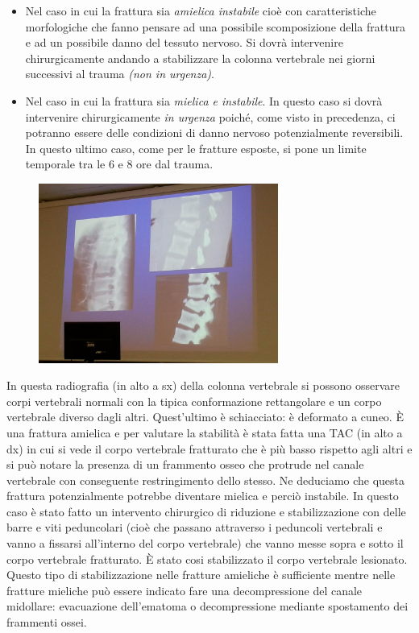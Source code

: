 \begin{itemize}
\begin{itemize}
\item
  Nel caso in cui la frattura sia \emph{amielica instabile} cioè con caratteristiche morfologiche che fanno pensare ad una possibile scomposizione della frattura e ad un possibile danno del tessuto nervoso. Si dovrà intervenire chirurgicamente andando a stabilizzare la colonna vertebrale nei giorni successivi al trauma \emph{(non in urgenza)}.
\item
  Nel caso in cui la frattura sia \emph{mielica e instabile}. In questo caso si dovrà intervenire chirurgicamente \emph{in urgenza} poiché, come visto in precedenza, ci potranno essere delle condizioni di danno nervoso potenzialmente reversibili. In questo ultimo caso, come per le fratture esposte, si pone un limite temporale tra le 6 e 8 ore dal trauma.
\end{itemize}
\end{itemize}

\begin{figure}[!ht]
\centering
\includegraphics[width=0.7\textwidth]{003/image2.jpeg}
\end{figure}

In questa radiografia (in alto a sx) della colonna vertebrale si possono osservare corpi vertebrali normali con la tipica conformazione rettangolare e un corpo vertebrale diverso dagli altri. Quest'ultimo è
schiacciato: è deformato a cuneo. È una frattura amielica e per valutare la stabilità è stata fatta una TAC (in alto a dx) in cui si vede il corpo vertebrale fratturato che è più basso rispetto agli altri e si può
notare la presenza di un frammento osseo che protrude nel canale vertebrale con conseguente restringimento dello stesso. Ne deduciamo che questa frattura potenzialmente potrebbe diventare mielica e perciò
instabile. In questo caso è stato fatto un intervento chirurgico di riduzione e stabilizzazione con delle barre e viti peduncolari (cioè che passano attraverso i peduncoli vertebrali e vanno a fissarsi all'interno
del corpo vertebrale) che vanno messe sopra e sotto il corpo vertebrale fratturato. È stato cosi stabilizzato il corpo vertebrale lesionato.
Questo tipo di stabilizzazione nelle fratture amieliche è sufficiente mentre nelle fratture mieliche può essere indicato fare una decompressione del canale midollare: evacuazione dell'ematoma o decompressione mediante spostamento dei frammenti ossei.

